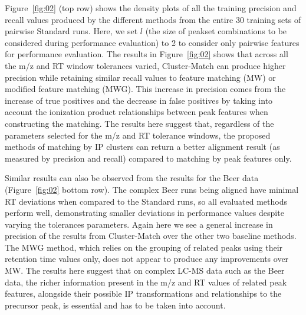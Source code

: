 Figure~\ref{fig:02} (top row) shows the density plots of all the training precision and recall values produced by the different methods from the entire 30 training sets of pairwise Standard runs. Here, we set $l$ (the size of peakset combinations to be considered during performance evaluation) to 2 to consider only pairwise features for performance evaluation. The results in Figure~\ref{fig:02} shows that across all the m/z and RT window tolerances varied, Cluster-Match can produce higher precision while retaining similar recall values to feature matching (MW) or modified feature matching (MWG). This increase in precision comes from the increase of true positives and the decrease in false positives by taking into account the ionization product relationships between peak features when constructing the matching. The results here suggest that, regardless of the parameters selected for the m/z and RT tolerance windows, the proposed methods of matching by IP clusters can return a better alignment result (as measured by precision and recall) compared to matching by peak features only.

Similar results can also be observed from the results for the Beer data (Figure~\ref{fig:02} bottom row). The complex Beer runs being aligned have minimal RT deviations when compared to the Standard runs, so all evaluated methods perform well, demonstrating smaller deviations in performance values despite varying the tolerances parameters. Again here we see a general increase in precision of the results from Cluster-Match over the other two baseline methods. The MWG method, which relies on the grouping of related peaks using their retention time values only, does not appear to produce any improvements over MW. The results here suggest that on complex LC-MS data such as the Beer data, the richer information present in the m/z and RT values of related peak features, alongside their possible IP transformations and relationships to the precursor peak, is essential and has to be taken into account.

